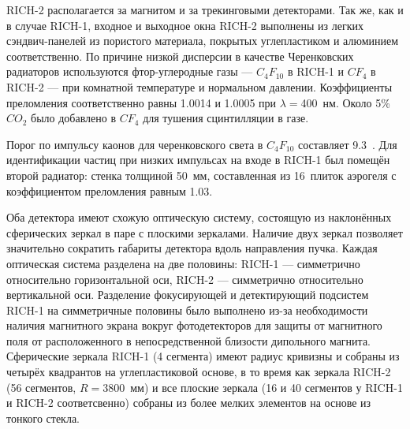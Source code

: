 
\mbox{RICH-2} располагается за магнитом и за трекинговыми детекторами.
Так же, как и в случае \mbox{RICH-1}, входное и выходное окна \mbox{RICH-2} выполнены из легких сэндвич-панелей из пористого материала, покрытых углепластиком и алюминием соответственно. По причине низкой дисперсии в качестве Черенковских радиаторов используются фтор-углеродные газы --- $C_{4}F_{10}$ в \mbox{RICH-1} и $CF_{4}$ в \mbox{RICH-2} --- при комнатной температуре и нормальном давлении. Коэффициенты преломления соответственно равны 1.0014 и 1.0005 при $\lambda = $400~нм. Около 5\% $CO_{2}$ было добавлено в $CF_{4}$ для тушения сцинтилляции в газе.

Порог по импульсу каонов для черенковского света в $C_{4}F_{10}$ составляет 9.3~\GeVoverC. Для идентификации частиц при низких импульсах на входе в \mbox{RICH-1} был помещён второй радиатор: стенка толщиной 50~мм, составленная из 16~плиток аэрогеля с коэффициентом преломления равным 1.03.

Оба детектора имеют схожую оптическую систему, состоящую из наклонённых сферических зеркал в паре с плоскими зеркалами. Наличие двух зеркал позволяет значительно сократить габариты детектора вдоль направления пучка. Каждая оптическая система разделена на две половины: \mbox{RICH-1} --- симметрично относительно горизонтальной оси, \mbox{RICH-2} --- симметрично относительно вертикальной оси. Разделение фокусирующей и детектирующий подсистем \mbox{RICH-1} на симметричные половины было выполнено из-за необходимости наличия магнитного экрана вокруг фотодетекторов для защиты от магнитного поля от расположенного в непосредственной близости дипольного магнита. Сферические зеркала \mbox{RICH-1} (4 сегмента) имеют радиус кривизны \todo и собраны из четырёх квадрантов на углепластиковой основе, в то время как зеркала \mbox{RICH-2} (56 сегментов, $R = 3800$~мм) и все плоские зеркала (16 и 40 сегментов у \mbox{RICH-1} и \mbox{RICH-2} соответсвенно) собраны из более мелких элементов на основе из тонкого стекла.

